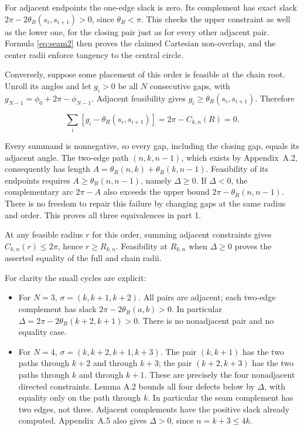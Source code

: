 For adjacent endpoints the one-edge slack is zero. Its complement has
exact slack $2\pi-2\theta_R(s_i,s_{i+1})>0$, since $\theta_R<\pi$.
This checks the upper constraint as well as the lower one, for the closing
pair just as for every other adjacent pair. Formula \eqref{eq:seam2} then proves the
claimed Cartesian non-overlap, and the center radii enforce tangency to the
central circle.

Conversely, suppose some placement of this order is feasible at the chain
root. Unroll its angles and let $g_i>0$ be all $N$ consecutive
gaps, with $g_{N-1}=\phi_0+2\pi-\phi_{N-1}$. Adjacent feasibility
gives $g_i\ge\theta_R(s_i,s_{i+1})$. Therefore

\[
 \sum_i[g_i-\theta_R(s_i,s_{i+1})]=2\pi-C_{k,n}(R)=0.
 \tag{A.11}\label{eq:seam11}
\]

Every summand is nonnegative, so every gap, including the closing gap, equals
its adjacent angle. The two-edge path $(n,k,n-1)$, which exists by
Appendix~A.2, consequently has length
$A=\theta_R(n,k)+\theta_R(k,n-1)$. Feasibility of its endpoints
requires $A\ge\theta_R(n,n-1)$, namely $\Delta\ge0$.
If $\Delta<0$, the complementary arc $2\pi-A$ also exceeds the
upper bound $2\pi-\theta_R(n,n-1)$. There is no freedom to repair
this failure by changing gaps at the same radius and order. This proves
all three equivalences in part 1.

At any feasible radius $r$ for this order, summing adjacent constraints
gives $C_{k,n}(r)\le2\pi$, hence $r\ge R_{k,n}$. Feasibility
at $R_{k,n}$ when $\Delta\ge0$ proves the asserted equality of
the full and chain radii.

For clarity the small cycles are explicit:

\begin{itemize}
\item For $N=3$, $\sigma=(k,k+1,k+2)$. All pairs are adjacent; each
two-edge complement has slack $2\pi-2\theta_R(a,b)>0$.
In particular $\Delta=2\pi-2\theta_R(k+2,k+1)>0$. There is no
nonadjacent pair and no equality case.
\item For $N=4$, $\sigma=(k,k+2,k+1,k+3)$. The pair $(k,k+1)$
has the two paths through $k+2$ and through $k+3$; the pair
$(k+2,k+3)$ has the two paths through $k$ and through $k+1$.
These are precisely the four nonadjacent directed constraints. Lemma A.2
bounds all four defects below by $\Delta$, with equality only on the
path through $k$. In particular the seam complement has two edges,
not three. Adjacent complements have the positive slack already computed.
Appendix~A.5 also gives $\Delta>0$, since $n=k+3\le4k$.
\end{itemize}

